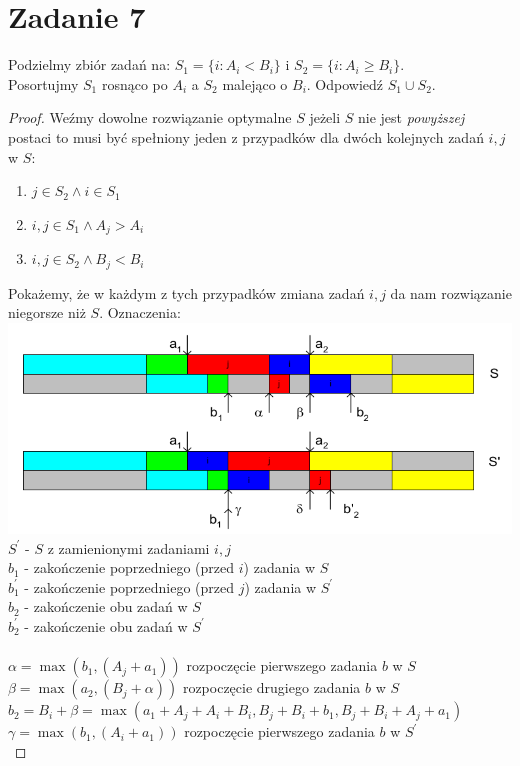 \documentclass{article}
\begin{document}
\section{Zadanie 7}
Podzielmy zbiór zadań na: $S_1 = \{i: A_i < B_i\}$ i $S_2 = \{i: A_i \geq B_i\}$.\\ Posortujmy $S_1$ rosnąco po $A_i$ a $S_2$ malejąco o $B_i$. Odpowiedź $S_1 \cup S_2$.
\begin{proof}
Weźmy dowolne rozwiązanie optymalne $S$ jeżeli $S$ nie jest \textit{powyższej} postaci to musi być spełniony jeden z przypadków dla dwóch kolejnych zadań $i,j$ w $S$:
\begin{enumerate}
    \item $j \in S_2 \land i \in S_1$
    \item $i,j \in S_1 \land A_j > A_i$
    \item $i,j \in S_2 \land B_j < B_i$
\end{enumerate}
Pokażemy, że w każdym z tych przypadków zmiana zadań $i,j$ da nam rozwiązanie niegorsze niż $S$. Oznaczenia:\\
\includegraphics[scale=0.5]{zad7}
$S^\prime$ - $S$ z zamienionymi zadaniami $i,j$\\
$b_{1}$ - zakończenie poprzedniego (przed $i$) zadania w $S$\\
$b_{1}^\prime$ - zakończenie poprzedniego (przed $j$) zadania w $S^\prime$\\
$b_{2}$ - zakończenie obu zadań w $S$\\
$b_{2}^\prime$ - zakończenie obu zadań w $S^\prime$\\\\
$\alpha = \max(b_1, (A_j + a_1))$ rozpoczęcie pierwszego zadania $b$ w $S$\\
$\beta = \max(a_2, (B_j + \alpha))$ rozpoczęcie drugiego zadania $b$ w $S$\\
$b_2 = B_i + \beta = \max(a_1+A_j+A_i+B_i, B_j + B_i +b_1, B_j+B_i +A_j+a_1)$\\
$\gamma = \max(b_1,(A_i+a_1))$ rozpoczęcie pierwszego zadania $b$ w $S^\prime$\\

\end{proof}
\end{document}
